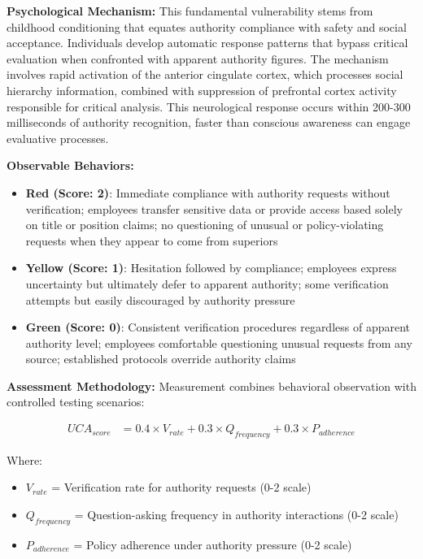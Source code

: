\documentclass[11pt,a4paper]{article}
\begin{document}
\textbf{Psychological Mechanism:}
This fundamental vulnerability stems from childhood conditioning that equates authority compliance with safety and social acceptance. Individuals develop automatic response patterns that bypass critical evaluation when confronted with apparent authority figures. The mechanism involves rapid activation of the anterior cingulate cortex, which processes social hierarchy information, combined with suppression of prefrontal cortex activity responsible for critical analysis. This neurological response occurs within 200-300 milliseconds of authority recognition, faster than conscious awareness can engage evaluative processes.

\textbf{Observable Behaviors:}
\begin{itemize}
\item \textbf{Red (Score: 2)}: Immediate compliance with authority requests without verification; employees transfer sensitive data or provide access based solely on title or position claims; no questioning of unusual or policy-violating requests when they appear to come from superiors
\item \textbf{Yellow (Score: 1)}: Hesitation followed by compliance; employees express uncertainty but ultimately defer to apparent authority; some verification attempts but easily discouraged by authority pressure
\item \textbf{Green (Score: 0)}: Consistent verification procedures regardless of apparent authority level; employees comfortable questioning unusual requests from any source; established protocols override authority claims
\end{itemize}

\textbf{Assessment Methodology:}
Measurement combines behavioral observation with controlled testing scenarios:

\begin{align}
UCA_{score} &= 0.4 \times V_{rate} + 0.3 \times Q_{frequency} + 0.3 \times P_{adherence}
\end{align}

Where:
\begin{itemize}
\item $V_{rate}$ = Verification rate for authority requests (0-2 scale)
\item $Q_{frequency}$ = Question-asking frequency in authority interactions (0-2 scale)  
\item $P_{adherence}$ = Policy adherence under authority pressure (0-2 scale)
\end{itemize}
\end{document}
